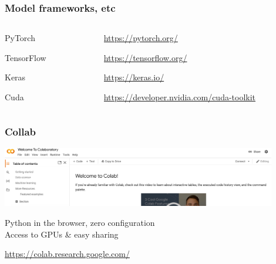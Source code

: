 \documentclass[17pt,aspectratio=169,hyperref={pdfusetitle,colorlinks,allcolors=olive}]{beamer}
\begin{document}
\begin{frame}[fragile]
  \frametitle{Model frameworks, etc}

    \begin{columns}[T]
    \begin{column}{.28\textwidth}

  \begin{flushright}
        PyTorch
  \end{flushright}

  \begin{flushright}
        TensorFlow
  \end{flushright}

  \begin{flushright}
        Keras
  \end{flushright}

  \begin{flushright}
        Cuda
  \end{flushright}
    \end{column}%
    \hfill%
    \begin{column}{.68\textwidth}
  \begin{flushright}
    {\small \url{https://pytorch.org/}}
  \end{flushright}

   \begin{flushright}
    {\small  \url{https://tensorflow.org/}}
  \end{flushright}

  \begin{flushright}
    {\small  \url{https://keras.io/}}
  \end{flushright}

    \begin{flushright}
    {\small  \url{https://developer.nvidia.com/cuda-toolkit}}
  \end{flushright}
   \end{column}%
  \end{columns}

  
\end{frame}

\begin{frame}[fragile]
  \frametitle{Collab}

  \begin{center}
    \includegraphics[width=12cm]{figs/collab}
  \end{center}

  Python in the browser, zero configuration \\
  Access to GPUs \& easy sharing \\

  \begin{flushright}
    {\small
      \url{https://colab.research.google.com/}
    }
  \end{flushright}
\end{frame}
\end{document}
